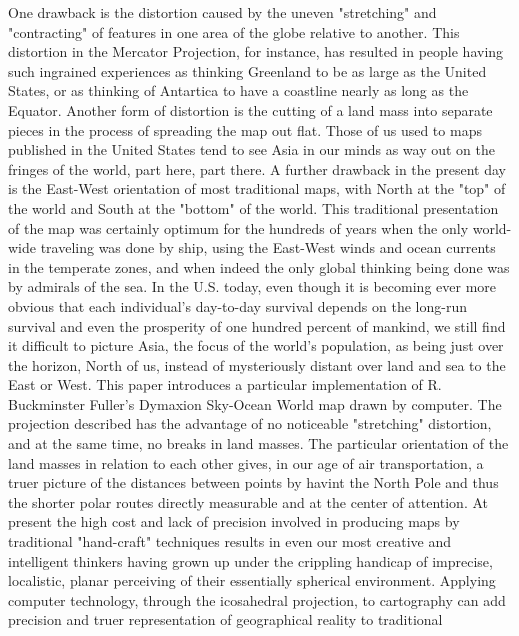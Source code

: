 \bigskip\flushpar
One drawback is the distortion caused by the
uneven "stretching" and "contracting" of features in
one area of the globe relative to another.  This
distortion in the Mercator Projection, for instance,
has resulted in people having such ingrained experiences
as thinking Greenland to be as large as the United
States, or as thinking of Antartica to have a coastline
nearly as long as the Equator.
\bigskip\flushpar
Another form of distortion is the cutting of a
land mass into separate pieces in the process of
spreading the map out flat.  Those of us used to maps
published in the United States tend to see Asia in
our minds as way out on the fringes of the world,
part here, part there.
\bigskip\flushpar
A further drawback in the present day is the
East-West orientation of most traditional maps, with
North at the "top" of the world and South at the
"bottom" of the world.  This traditional presentation
of the map was certainly optimum for the hundreds of
years when the only world-wide traveling was done by
ship, using the East-West winds and ocean currents in the
temperate zones, and when indeed the only global thinking
being done was by admirals of the sea.
\bigskip\flushpar
In the U.S. today, even though it is becoming
ever more obvious that each individual's day-to-day
survival depends on the long-run survival and even
the prosperity of one hundred percent of mankind, we
still find it difficult to picture Asia, the focus of
the world's population, as being just over the horizon,
North of us, instead of mysteriously distant over land
and sea to the East or West.
\bigskip\flushpar
This paper introduces a particular implementation
of R. Buckminster Fuller's Dymaxion Sky-Ocean World
map drawn by computer.  The projection described has
the advantage of no noticeable "stretching" distortion,
and at the same time, no breaks in land masses.  The
particular orientation of the land masses in relation
to each other gives, in our age of air transportation,
a truer picture of the distances between points by
havint the North Pole and thus the shorter polar routes
directly measurable and at the center of attention.
\bigskip\flushpar
At present the high cost and lack of precision
involved in producing maps by traditional "hand-craft"
techniques results in even our most creative and
intelligent thinkers having grown up under the
crippling handicap of imprecise, localistic, planar
perceiving of their essentially spherical environment.
\bigskip\flushpar
Applying computer technology, through the icosahedral
projection, to cartography can add precision and
truer representation of geographical reality to traditional
